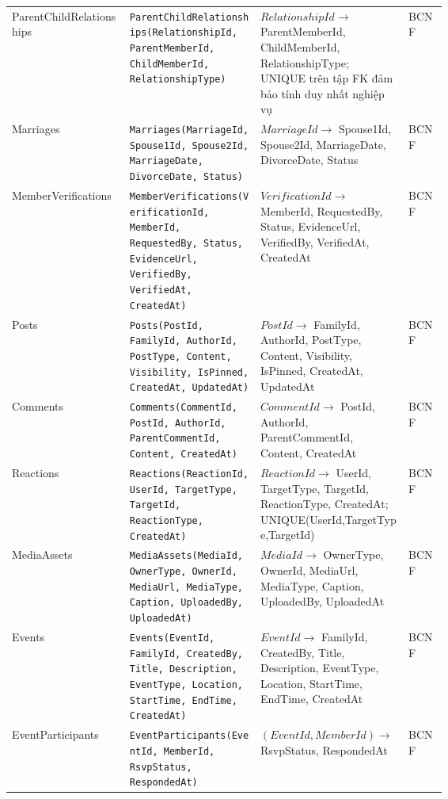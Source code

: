 \begin{center}
\begin{tabularx}{\linewidth}{@{}l>{\raggedright\arraybackslash}p{0.30\linewidth}>{\raggedright\arraybackslash}p{0.34\linewidth}l@{}}
ParentChildRelationships &
\texttt{ParentChildRelationships(RelationshipId, ParentMemberId, ChildMemberId, RelationshipType)} &
$RelationshipId \rightarrow$ ParentMemberId, ChildMemberId, RelationshipType; UNIQUE trên tập FK đảm bảo tính duy nhất nghiệp vụ &
BCNF \\

Marriages &
\texttt{Marriages(MarriageId, Spouse1Id, Spouse2Id, MarriageDate, DivorceDate, Status)} &
$MarriageId \rightarrow$ Spouse1Id, Spouse2Id, MarriageDate, DivorceDate, Status &
BCNF \\

MemberVerifications &
\texttt{MemberVerifications(VerificationId, MemberId, RequestedBy, Status, EvidenceUrl, VerifiedBy, VerifiedAt, CreatedAt)} &
$VerificationId \rightarrow$ MemberId, RequestedBy, Status, EvidenceUrl, VerifiedBy, VerifiedAt, CreatedAt &
BCNF \\

Posts &
\texttt{Posts(PostId, FamilyId, AuthorId, PostType, Content, Visibility, IsPinned, CreatedAt, UpdatedAt)} &
$PostId \rightarrow$ FamilyId, AuthorId, PostType, Content, Visibility, IsPinned, CreatedAt, UpdatedAt &
BCNF \\

Comments &
\texttt{Comments(CommentId, PostId, AuthorId, ParentCommentId, Content, CreatedAt)} &
$CommentId \rightarrow$ PostId, AuthorId, ParentCommentId, Content, CreatedAt &
BCNF \\

Reactions &
\texttt{Reactions(ReactionId, UserId, TargetType, TargetId, ReactionType, CreatedAt)} &
$ReactionId \rightarrow$ UserId, TargetType, TargetId, ReactionType, CreatedAt; UNIQUE(UserId,TargetType,TargetId) &
BCNF \\

MediaAssets &
\texttt{MediaAssets(MediaId, OwnerType, OwnerId, MediaUrl, MediaType, Caption, UploadedBy, UploadedAt)} &
$MediaId \rightarrow$ OwnerType, OwnerId, MediaUrl, MediaType, Caption, UploadedBy, UploadedAt &
BCNF \\

Events &
\texttt{Events(EventId, FamilyId, CreatedBy, Title, Description, EventType, Location, StartTime, EndTime, CreatedAt)} &
$EventId \rightarrow$ FamilyId, CreatedBy, Title, Description, EventType, Location, StartTime, EndTime, CreatedAt &
BCNF \\

EventParticipants &
\texttt{EventParticipants(EventId, MemberId, RsvpStatus, RespondedAt)} &
$(EventId,MemberId)\rightarrow$ RsvpStatus, RespondedAt &
BCNF \\


\end{tabularx}
\end{center}
